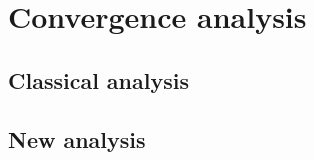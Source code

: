 \section{Convergence analysis}
\subsection{Classical analysis}
\subsection{New analysis}
\subsection{}

